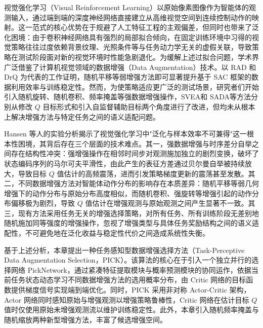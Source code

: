 


视觉强化学习（Visual Reinforcement Learning）以原始像素图像作为智能体的观测输入，通过端到端的深度神经网络直接建立从高维视觉空间到连续控制动作的映射。这一范式的核心优势在于规避了人工特征工程的主观偏差，但同时也带来了泛化困境：由于卷积神经网络具有强烈的局部拟合倾向，在固定训练环境中习得的视觉策略往往过度依赖背景纹理、光照条件等与任务动力学无关的虚假关联，导致策略在测试阶段面对新的视觉环境时性能急剧退化。为缓解上述过拟合问题，学术界广泛借鉴了计算机视觉领域的数据增强（Data Augmentation）技术。以 RAD\cite{laskin2020reinforcement} 和 DrQ\cite{kostrikov2020image} 为代表的工作证明，随机平移等弱增强方法即可显著提升基于 SAC 框架的数据利用效率与训练稳定性。然而，为使策略适应更广泛的测试场景，研究者们开始引入随机旋转、随机卷积、频率掩盖等强数据增强操作，SVEA\cite{hansen2021stabilizing}和 SADA\cite{almuzairee2024recipe}等方法分别从修改 $Q$ 目标形式和引入自监督辅助目标两个角度进行了改进，但均未从根本上解决增强方法与特定任务之间的语义适配问题。

Hansen 等人\cite{hansen2021generalization}的实验分析揭示了视觉强化学习中"泛化与样本效率不可兼得"这一根本性困境，其背后存在三个层面的技术难点。其一，强数据增强与时序差分自举之间存在结构性冲突：强增强操作在相邻时间步对观测施加独立的剧烈变换，破坏了状态编码序列的马尔可夫平滑性，由此产生的表征方差通过贝尔曼自举被持续放大，导致目标 $Q$ 值估计的高频震荡，进而引发策略梯度更新的震荡甚至发散。其二，不同数据增强方法对智能体动作分布的影响存在本质差异：随机平移等弱几何增强下的动作分布与原始分布高度相似，而随机卷积、强旋转等增强引起的动作分布偏移极为剧烈，导致 $Q$ 值估计在增强观测与原始观测之间产生显著不一致。其三，现有方法采用任务无关的增强选择策略，对所有任务、所有训练阶段无差别地随机施加同等强度的增强操作，忽视了增强类型与具体任务奖励结构之间的语义适配性，不可避免地在泛化收益与稳定性代价之间造成系统性失衡。

基于上述分析，本章提出一种任务感知型数据增强选择方法（Task-Perceptive Data Augmentation Selection，PICK）。该算法的核心在于引入一个独立并行的选择网络 PickNetwork，通过紧凑特征提取模块与概率预测模块的协同运作，依据当前任务状态动态学习不同数据增强方法的选用概率分布，由 Critic 网络的目标函数提供梯度信号实现端到端优化。同时，PICK 采用非对称 Actor-Critic 架构，Actor 网络同时感知原始与增强观测以增强策略鲁棒性，Critic 网络在估计目标 $Q$ 值时仅使用原始未增强观测流以维护训练稳定性。此外，本章引入随机频率掩盖与随机缩放两种新型增强方法，丰富了候选增强空间。

